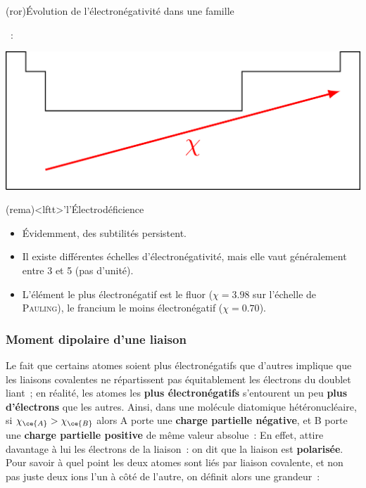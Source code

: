 \documentclass[../../main/main.tex]{subfiles}
\begin{document}
\begin{tcb*}(ror){Évolution de l'électronégativité dans une famille}
\end{tcb*}
\begin{itemize}
	~:
\end{itemize}
\begin{center}
	\includegraphics[scale=1]{elecnegtab}
\end{center}

\begin{tcb*}(rema)<lftt>'l'{Électrodéficience}
	\begin{itemize}
		\item Évidemment, des subtilités persistent.
		\item Il existe différentes échelles d'électronégativité, mais elle vaut
		      généralement entre 3 et 5 (pas d'unité).
		\item L'élément le plus électronégatif est le fluor ($\chi = \num{3.98}$
		      sur l'échelle de \textsc{Pauling}), le francium le moins
		      électronégatif ($\chi = \num{0.70}$).
	\end{itemize}
\end{tcb*}

\subsubsection{Moment dipolaire d'une liaison}

Le fait que certains atomes soient plus électronégatifs que d'autres implique
que les liaisons covalentes ne répartissent pas équitablement les électrons du
doublet liant~; en réalité, les atomes les \textbf{plus électronégatifs}
s'entourent un peu \textbf{plus d'électrons} que les autres.
\bigbreak
Ainsi, dans une molécule diatomique hétéronucléaire, si $\chi_{\ce{A}} > \chi_{\ce{B}}$ alors A porte une
\textbf{charge partielle négative}, et B porte une \textbf{charge partielle
	positive} de même valeur absolue~:
\psw{
	\[
		\cfig{
			\charge{90=\|,180=\|,-90=\|,120:4pt=$-q$}{A}-
			\charge{60:4pt=$+q$}{B}
		}
	\]
}
En effet,  attire davantage à lui les électrons de la liaison~: on dit que
la liaison est \textbf{polarisée}. Pour savoir à quel point les deux atomes sont
liés par liaison covalente, et non pas juste deux ions l'un à côté de l'autre,
on définit alors une grandeur~:
\end{document}
